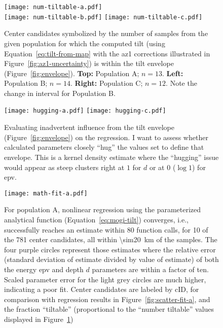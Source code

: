 \begin{figure}
    \begin{center}
     \texttt{[image: num-tiltable-a.pdf]}\\
     \texttt{[image: num-tiltable-b.pdf]}%
     \texttt{[image: num-tiltable-c.pdf]}
     \caption[Inflation center candidates by number of ``tiltable'' samples]{Center candidates symbolized by the number of samples from the given population for which the computed tilt (using Equation~\eqref{eq:tilt-from-map} with the \acs{az1} corrections illustrated in Figure~\ref{fig:az1-uncertainty}) is within the tilt envelope (Figure~\ref{fig:envelope}). \textbf{Top:} Population A; $n=13$. \textbf{Left:} Population B; $n=14$. \textbf{Right:} Population C; $n=12$. Note the change in interval for Population B.} 
     \label{fig:num-tiltable}
    \end{center}
\end{figure}

\begin{figure}
    \texttt{[image: hugging-a.pdf]}
    \texttt{[image: hugging-c.pdf]}
    \caption[Check for envelope ``hugging'']{Evaluating inadvertent influence from the tilt envelope (Figure~\ref{fig:envelope}) on the regression. I want to assess whether calculated parameters closely ``hug'' the values set to define that envelope. This is a kernel density estimate where the ``hugging'' issue would appear as steep clusters right at $1$ for $d$ or at $0$ ($\log1$) for \acs{epv}.} 
    \label{fig:hugging}
\end{figure}

\begin{figure}
    \texttt{[image: math-fit-a.pdf]}%
    \caption[Population A: goodness of fit]{For population A, nonlinear regression using the parameterized analytical function (Equation~\eqref{eq:mogi-tilt}) converges, i.e., successfully reaches an estimate within 80 function calls, for 10 of the 781 center candidates, all within \qty{\sim20}{\km} of the samples. The four purple circles represent those estimates where the relative error (standard deviation of estimate divided by value of estimate) of both the energy \acs{epv} and depth $d$ parameters are within a factor of ten. Scaled parameter error for the light grey circles are much higher, indicating a poor fit. Center candidates are labeled by cID, for comparison with regression results in Figure~\ref{fig:scatter-fit-a}, and the fraction ``tiltable'' (proportional to the ``number tiltable'' values displayed in Figure~\ref{fig:num-tiltable})}%
    \label{fig:math-fit-a}
\end{figure}


